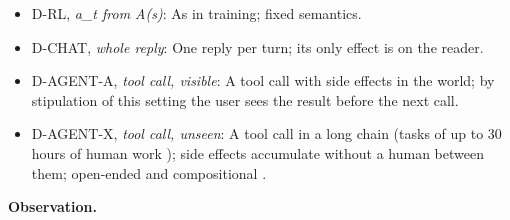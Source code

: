 \documentclass{article}
\begin{document}
\begin{itemize}
\item
  D-RL, \emph{a\_t from A(s)}: As in training; fixed semantics.
\item
  D-CHAT, \emph{whole reply}: One reply per turn; its only effect is on the reader.
\item
  D-AGENT-A, \emph{tool call, visible}: A tool call with side effects in the world; by stipulation of this setting the user sees the result before the next call.
\item
  D-AGENT-X, \emph{tool call, unseen}: A tool call in a long chain (tasks of up to 30 hours of human work \citep{kwa2025}); side effects accumulate without a human between them; open-ended and compositional \citep{ruan2024}.
\end{itemize}

\textbf{Observation.}
\end{document}
